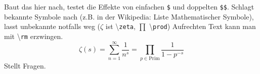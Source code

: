 
\begin{frame}
	Baut das hier nach, testet die Effekte von einfachen \lstinline+$+ und doppelten \lstinline+$$+. Schlagt bekannte Symbole nach (z.B. in der Wikipedia: Liste Mathematischer Symbole), lasst unbekannte notfalls weg ($\zeta$ ist \textbackslash\lstinline+zeta+, $\prod$ \textbackslash\lstinline+prod+) Aufrechten Text kann man mit \textbackslash\lstinline+rm+ erzwingen.
	$$ \zeta(s)
		= \sum_{n=1}^\infty \frac{1}{n^s}
		= \prod_{p \in \text{Prim}} \frac{1}{1-p^{-s}}
	$$
	Stellt Fragen.
\end{frame}
